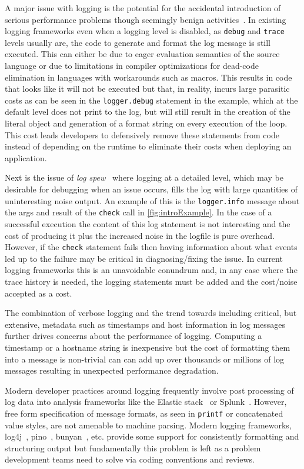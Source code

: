 \documentclass[sigplan,10pt,screen]{acmart}
\begin{document}
A major issue with logging is the potential for the accidental introduction 
of serious performance problems though seemingly benign activities~\cite{logdebug,logdebug2,logstudy,learnlog,logstudy2}. In 
existing logging frameworks even when a logging level is disabled, 
as \texttt{debug} and \texttt{trace} levels usually are, the code to generate 
and format the log message is still executed. This can either be due to eager 
evaluation semantics of the source language or due to limitations in compiler 
optimizations for dead-code elimination in languages with workarounds such as 
macros. This results in code that looks like it will not be executed but that, in 
reality, incurs large parasitic costs as can be seen in the \texttt{logger.debug} 
statement in the example, which at the default level does not print to the log, but will
still result in the creation of the literal object and generation of a format
string on every execution of the loop. This cost leads developers to defensively
remove these statements from code instead of depending on the runtime to
eliminate their costs when deploying an application.

Next is the issue of \emph{log spew}~\cite{learnlog,logstudy2} where logging at a detailed level, which 
may be desirable for debugging when an issue occurs, fills the log with 
large quantities of uninteresting noise output. An example of this is the 
\texttt{logger.info} message about the args and result of the \texttt{check} 
call in \autoref{fig:introExample}. In the case of a successful execution the content of this log statement 
is not interesting and the cost of producing it plus the increased noise in 
the logfile is pure overhead. However, if the \texttt{check} statement fails 
then having information about what events led up to the failure may be 
critical in diagnosing/fixing the issue. In current logging frameworks this is 
an unavoidable conundrum and, in any case where the trace history is needed, 
the logging statements must be added and the cost/noise accepted as a cost.

The combination of verbose logging and the trend towards including critical, but 
extensive, metadata such as timestamps and host information in log messages further 
drives concerns about the performance of logging. Computing a timestamp or a 
hostname string is inexpensive but the cost of formatting them into a message is 
non-trivial can can add up over thousands or millions of log messages resulting 
in unexpected performance degradation. 

Modern developer practices around logging frequently involve post processing 
of log data into analysis frameworks like the Elastic stack~\cite{elastic} or Splunk~\cite{splunk}. 
However, free form specification of message formats, as seen in \texttt{printf} or 
concatenated value styles, are not amenable to machine parsing. Modern logging 
frameworks, log4j~\cite{log4j}, pino~\cite{pino}, bunyan~\cite{bunyan}, etc. 
provide some support for consistently formatting and structuring output but
fundamentally this problem is left as a problem development teams need to solve
via coding conventions and reviews.
\end{document}
